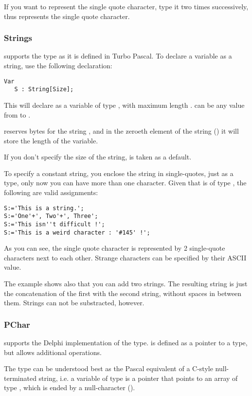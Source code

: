 \documentclass{report}
\begin{document}
If you want to represent the single quote character, type it two times
successively, thus  represents the single quote character.

\subsubsection{Strings}

\fpk supports the  type as it is defined in Turbo Pascal.
To declare a variable as a string, use the following declaration:
\begin{verbatim}
Var
   S : String[Size];
\end{verbatim}
This will declare  as a variable of type , with maximum
length .  can be any value from  to .

\fpk reserves  bytes for the string , and in the zeroeth
element of the string () it will store the length of the variable.

If you don't specify the size of the string,  is taken as a
default.

To specify a constant string, you enclose the string in single-quotes, just
as a  type, only now you can have more than one character.
Given that  is of type , the following are valid assignments: 
\begin{verbatim}
S:='This is a string.';
S:='One'+', Two'+', Three';
S:='This isn''t difficult !';
S:='This is a weird character : '#145' !';
\end{verbatim}
As you can see, the single quote character is represented by 2 single-quote
characters next to each other. Strange characters can be specified by their
ASCII value.

The example shows also that you can add two strings. The resulting string is
just the concatenation of the first with the second string, without spaces in
between them. Strings can not be substracted, however.

\subsubsection{PChar}

\fpk supports the Delphi implementation of the  type. 
is defined as a pointer to a  type, but allows additional
operations. 

The  type can be understood best as the Pascal equivalent of a
C-style null-terminated string, i.e. a variable of type  is a pointer
that points to an array of type , which is ended by a
null-character ().
\end{document}
